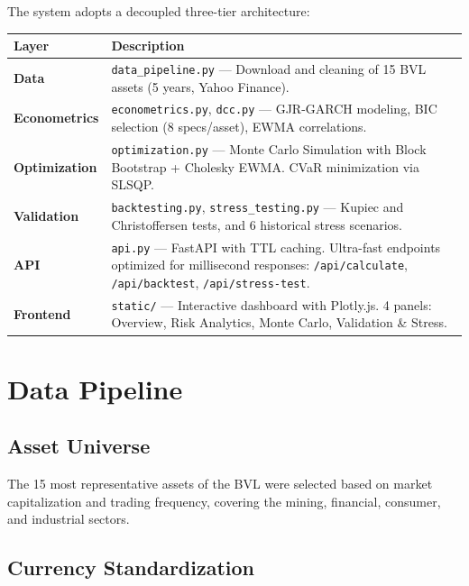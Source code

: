 \documentclass[11pt,a4paper]{article}
\begin{document}
The system adopts a decoupled three-tier architecture:

\begin{center}
\begin{tabular}{l l}
\toprule
\textbf{Layer} & \textbf{Description} \\
\midrule
\textbf{Data} & \parbox[t]{12.5cm}{\texttt{data\_pipeline.py} --- Download and cleaning of 15 BVL assets (5 years, Yahoo Finance).} \\[3pt]
\textbf{Econometrics} & \parbox[t]{12.5cm}{\texttt{econometrics.py}, \texttt{dcc.py} --- GJR-GARCH modeling, BIC selection (8 specs/asset), EWMA correlations.} \\[3pt]
\textbf{Optimization} & \parbox[t]{12.5cm}{\texttt{optimization.py} --- Monte Carlo Simulation with Block Bootstrap + Cholesky EWMA. CVaR minimization via SLSQP.} \\[3pt]
\textbf{Validation} & \parbox[t]{12.5cm}{\texttt{backtesting.py}, \texttt{stress\_testing.py} --- Kupiec and Christoffersen tests, and 6 historical stress scenarios.} \\[3pt]
\textbf{API} & \parbox[t]{12.5cm}{\texttt{api.py} — FastAPI with TTL caching. Ultra-fast endpoints optimized for millisecond responses: \texttt{/api/calculate}, \texttt{/api/backtest}, \texttt{/api/stress-test}.} \\[4pt]
\textbf{Frontend} & \parbox[t]{12.5cm}{\texttt{static/} — Interactive dashboard with Plotly.js. 4 panels: Overview, Risk Analytics, Monte Carlo, Validation \& Stress.} \\
\bottomrule
\end{tabular}
\end{center}

\section{Data Pipeline}

\subsection{Asset Universe}

The 15 most representative assets of the BVL were selected based on market capitalization and
trading frequency, covering the mining, financial, consumer, and industrial sectors.

\subsection{Currency Standardization}
\end{document}
